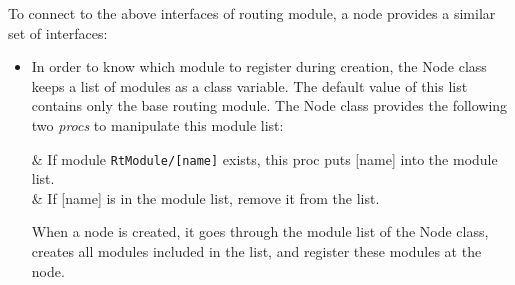 To connect to the above interfaces of routing module, a node provides
a similar set of interfaces:
\begin{itemize}
\item %
  In order to know which module to register during creation, the Node
  class keeps a list of modules as a class variable. 
  The default value of this list contains only the base routing
  module.
  The Node class provides the following two {\em procs} to manipulate
  this module list:
  \begin{\par\tabular{\textwidth}{rX}}
     & If module
    {\tt RtModule/[name]} exists, this proc puts [name] into the
    module list. \\ 
     & If
    [name] is in the module 
    list, remove it from the list. 
  \end{\par\tabular{\textwidth}{rX}}
  When a node is created, it goes through the module list of the Node
  class, creates all modules included in the list, and register these
  modules at the node.


\end{itemize}
